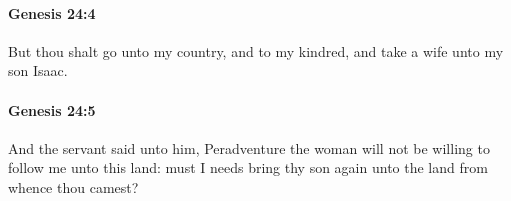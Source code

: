 		\paragraph{Genesis 24:4} %
			\label{GENESIS-24-4}

			But thou shalt go unto my country, and to my kindred, and take a wife unto my son Isaac.


		\paragraph{Genesis 24:5} %
			\label{GENESIS-24-5}

			And the servant said unto him, Peradventure the woman will not be willing to follow me unto this land: must I needs bring thy son again unto the land from whence thou camest?


